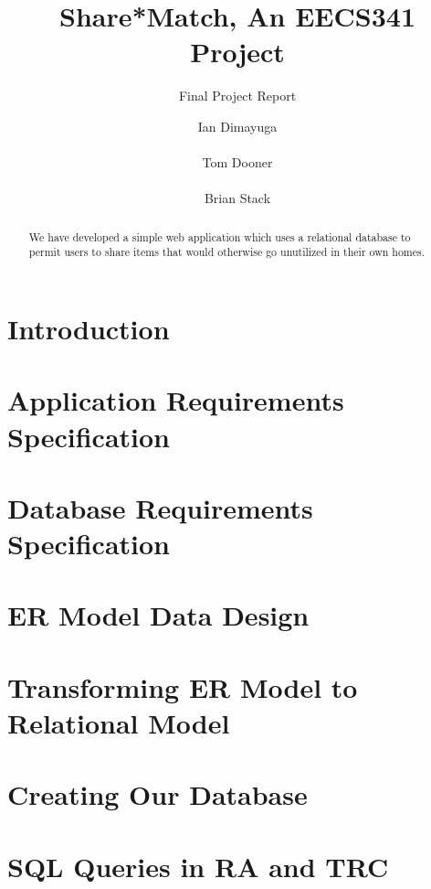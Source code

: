 \documentclass{acm_proc_article-sp}
\begin{document}
\title{Share*Match, An EECS341 Project}
\subtitle{Final Project Report}
\author{
\alignauthor Ian Dimayuga \\
    \\
\alignauthor Tom Dooner \\
    \\
\alignauthor Brian Stack \\
}
\maketitle
\begin{abstract}
We have developed a simple web application which uses a relational database to permit users to share items that would otherwise go unutilized in their own homes.
\end{abstract}

\section{Introduction}

\section{Application Requirements Specification}

\section{Database Requirements Specification}

\section{ER Model Data Design}

\section{Transforming ER Model to Relational Model}

\section{Creating Our Database}

\section{SQL Queries in RA and TRC}
\end{document}
